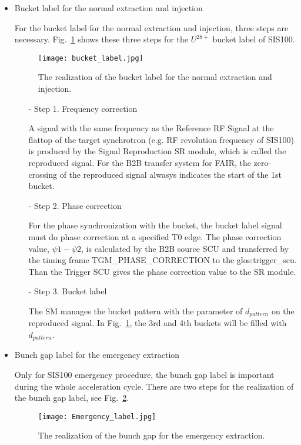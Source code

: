 \begin{itemize}
\item Bucket label for the normal extraction and injection

For the bucket label for the normal extraction and injection, three steps are necessary. Fig.~\ref{bucket_label} shows these three steps for the $U^{28+}$ bucket label of SIS100.
\begin{figure}[!htb]
   \centering   
   \texttt{[image: bucket\_label.jpg]}
   \caption{The realization of the bucket label for the normal extraction and injection.}
   \label{bucket_label}
\end{figure}  
\begin{itemize}
\item[-] Step 1. Frequency correction

A signal with the same frequency as the Reference RF Signal at the flattop of the target synchrotron (e.g. RF revolution frequency of SIS100) is produced by the Signal Reproduction \gls{SR module}, which is called the reproduced signal. For the B2B transfer system for FAIR, the zero-crossing of the reproduced signal alwasys indicates the start of the 1st bucket.
\item[-] Step 2. Phase correction

For the phase synchronization with the bucket, the bucket label signal must do phase correction at a specified T0 edge. The phase correction value, $\psi1 - \psi2$, is calculated by the B2B source SCU and transferred by the timing frame TGM\_PHASE\_CORRECTION to the \gls{glos:trigger_scu}. Than the Trigger SCU gives the phase correction value to the SR module.

\item[-] Step 3. Bucket label

The SM manages the bucket pattern with the parameter of $d_{pattern}$ on the reproduced signal. In Fig.~\ref{bucket_label}, the 3rd and 4th buckets will be filled with $d_{pattern}$.
\end{itemize}

\item Bunch gap label for the emergency extraction

Only for SIS100 emergency procedure, the bunch gap label is important during the whole acceleration cycle. There are two steps for the realization of the bunch gap label, see Fig.~\ref{Emergency_label}.
\begin{figure}[!htb]
   \centering   
   \texttt{[image: Emergency\_label.jpg]}
   \caption{The realization of the bunch gap for the emergency extraction.}
   \label{Emergency_label}
\end{figure} 


\end{itemize}
